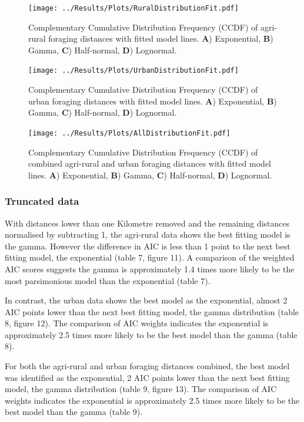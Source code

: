 \documentclass[11pt,usenames,dvipsnames,a4paper]{article}
\begin{document}
\begin{figure}[H]
	\centering
	\texttt{[image: ../Results/Plots/RuralDistributionFit.pdf]}
	\caption{Complementary Cumulative Distribution Frequency (CCDF) of agri-rural foraging distances with fitted model lines. \textbf{A}) Exponential, \textbf{B}) Gamma, \textbf{C}) Half-normal, \textbf{D}) Lognormal.}
\end{figure}

\begin{figure}[H]
	\centering
	\texttt{[image: ../Results/Plots/UrbanDistributionFit.pdf]}
	\caption{Complementary Cumulative Distribution Frequency (CCDF) of urban foraging distances with fitted model lines. \textbf{A}) Exponential, \textbf{B}) Gamma, \textbf{C}) Half-normal, \textbf{D}) Lognormal.}
\end{figure}

\begin{figure}[H]
	\centering
	\texttt{[image: ../Results/Plots/AllDistributionFit.pdf]}
	\caption{Complementary Cumulative Distribution Frequency (CCDF) of combined agri-rural and urban foraging distances with fitted model lines. \textbf{A}) Exponential, \textbf{B}) Gamma, \textbf{C}) Half-normal, \textbf{D}) Lognormal.}
\end{figure}

\subsubsection{Truncated data}

\begin{linenumbers}
\hspace{\parindent}
With distances lower than one Kilometre removed and the remaining distances normalised by subtracting 1, the agri-rural data shows the best fitting model is the gamma. However the difference in AIC is less than 1 point to the next best fitting model, the exponential (table 7, figure 11). A comparison of the weighted AIC scores suggests the gamma is approximately 1.4 times more likely to be the most parsimonious model than the exponential (table 7).

In contrast, the urban data shows the best model as the exponential, almost 2 AIC points lower than the next best fitting model, the gamma distribution (table 8, figure 12). The comparison of AIC weights indicates the exponential is approximately 2.5 times more likely to be the best model than the gamma (table 8).

For both the agri-rural and urban foraging distances combined, the best model was identified as the exponential, 2 AIC points lower than the next best fitting model, the gamma distribution (table 9, figure 13). The comparison of AIC weights indicates the exponential is approximately 2.5 times more likely to be the best model than the gamma (table 9). 
\end{linenumbers}
\end{document}
